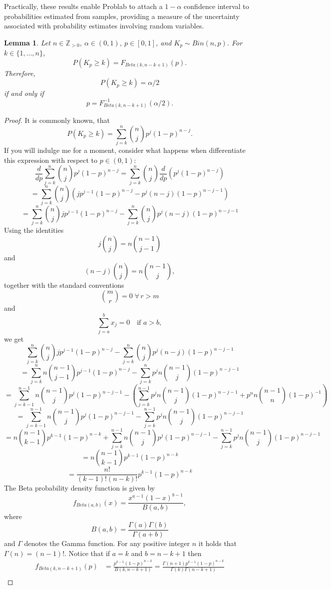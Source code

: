 \documentclass{article}
\newtheorem{lemma}{Lemma}
\begin{document}
Practically, these results enable Problab to attach a $1-\alpha$ confidence interval to probabilities estimated from samples, providing a measure of the uncertainty associated with probability estimates involving random variables.
\vspace{0.5em}
\begin{lemma}\label{lemma:Lower_Clopper-Pearson_endpoint}
Let $n\in\mathbb{Z}_{>0}$, $\alpha\in(0,1)$, $p\in[0,1]$, and $K_p\sim Bin(n,p)$. For $k\in\{1,\ldots,n\}$,
$$P(K_p\geq k)=F_{Beta(k,n-k+1)}(p).$$
Therefore,
$$P(K_p\geq k)=\alpha/2$$
if and only if
$$p=F_{Beta(k,n-k+1)}^{-1}(\alpha/2).$$
\end{lemma}
\begin{proof}
It is commonly known, that
$$P(K_p\geq k)=\sum_{j=k}^n\binom{n}{j}p^j(1-p)^{n-j}.$$
If you will indulge me for a moment, consider what happens when differentiate this expression with respect to $p\in(0,1)$:
$$\frac{d}{dp}\sum_{j=k}^n\binom{n}{j}p^j(1-p)^{n-j}=\sum_{j=k}^n\binom{n}{j}\frac{d}{dp}\left(p^j(1-p)^{n-j}\right)$$
$$=\sum_{j=k}^n\binom{n}{j}\left(jp^{j-1}(1-p)^{n-j}-p^j(n-j) (1-p)^{n-j-1}\right)$$
$$=\sum_{j=k}^n\binom{n}{j}jp^{j-1}(1-p)^{n-j}-\sum_{j=k}^n\binom{n}{j}p^j(n-j) (1-p)^{n-j-1}$$
Using the identities
$$j\binom{n}{j}=n\binom{n-1}{j-1}$$
and
$$(n-j)\binom{n}{j}=n\binom{n-1}{j},$$
together with the standard conventions
$$\binom{m}{r}=0\;\forall\,r>m$$
and
$$\sum_{j=a}^{b}x_j=0\quad\text{if }a>b,$$
we get
$$\sum_{j=k}^n\binom{n}{j}jp^{j-1}(1-p)^{n-j}-\sum_{j=k}^n\binom{n}{j}p^j(n-j) (1-p)^{n-j-1}$$
$$=\sum_{j=k}^nn\binom{n-1}{j-1}p^{j-1}(1-p)^{n-j}-\sum_{j=k}^np^jn\binom{n-1}{j} (1-p)^{n-j-1}$$
$$=\sum_{j=k-1}^{n-1}n\binom{n-1}{j}p^{j}(1-p)^{n-j-1}-\left(\sum_{j=k}^{n-1}p^jn\binom{n-1}{j} (1-p)^{n-j-1}+p^nn\binom{n-1}{n}(1-p)^{-1}\right)$$
$$=\sum_{j=k-1}^{n-1}n\binom{n-1}{j}p^{j}(1-p)^{n-j-1}-\sum_{j=k}^{n-1}p^jn\binom{n-1}{j} (1-p)^{n-j-1}$$
$$=n\binom{n-1}{k-1}p^{k-1}(1-p)^{n-k}+\sum _{j=k}^{n-1}n\binom{n-1}{j}p^{j}(1-p)^{n-j-1}-\sum_{j=k}^{n-1}p^jn\binom{n-1}{j} (1-p)^{n-j-1}$$
$$=n\binom{n-1}{k-1}p^{k-1}(1-p)^{n-k}$$
$$=\frac{n!}{(k-1)!(n-k)!}p^{k-1}(1-p)^{n-k}$$
The Beta probability density function is given by
$$f_{Beta(a,b)}(x)=\frac{x^{a-1}(1-x)^{b -1}}{B(a,b)},$$
where 
$$B(a,b)=\frac{\Gamma(a)\Gamma(b)}{\Gamma(a+b)}$$
and $\Gamma$ denotes the Gamma function. For any positive integer $n$ it  holds that $\Gamma(n)=(n-1)!$. Notice that if $a=k$ and $b=n-k+1$ then
$$\begin{aligned}
    f_{Beta(k,n-k+1)}(p)&=\frac{p^{k-1}(1-p)^{n-k}}{B(k,n-k+1)}=\frac{\Gamma(n+1)p^{k-1}(1-p)^{n-k}}{\Gamma(k)\Gamma(n-k+1)}\\

\end{aligned}$$
\end{proof}
\end{document}
